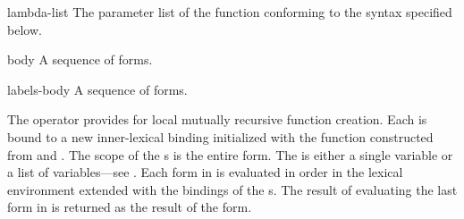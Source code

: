 \begin{optDefinition}
\begin{arguments}
    \item[lambda-list] The parameter list of the function conforming to the
    syntax specified below.

    \item[body] A sequence of forms.

    \item[labels-body] A sequence of forms.
\end{arguments}
%
\result%
The  operator provides for local mutually recursive function
creation.  Each  is bound to a new inner-lexical binding
initialized with the function constructed from  and
.  The scope of the s is the entire
 form.  The  is either a single variable or a list
of variables---see .  Each form in  is
evaluated in order in the lexical environment extended with the bindings of the
s.  The result of evaluating the last form in
 is returned as the result of the  form.


\end{optDefinition}
